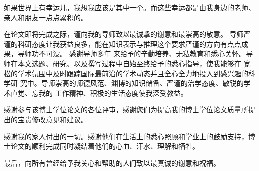 \begin{thanks}
如果世界上有幸运儿，我想我应该是其中一个。而这些幸运都是由我身边的老师、亲人和朋友一点点累积的。

在论文即将完成之际，谨向我的导师致以最诚挚的谢意和最崇高的敬意。
导师严谨的科研态度让我获益良多，能在知识表示与推理这个要求严谨的方向有点点成果，导师功不可没。
感谢导师多年
来给予的辛勤培养、无私教育和悉心关怀。导师在本文选题、研究、以及撰写过程中自始至终给予的悉心指导，使我能够在
宽松的学术氛围中及时跟踪国际最前沿的学术动态并且全心全力地投入到感兴趣的科学研
究中。导师崇高的师德风范、渊博的知识储备、严谨的治学态度、敏锐的学术直觉、忘我的
工作精神、积极的生活态度使我深受教益。


感谢参与该博士学位论文的各位评审，感谢您们为提高我的博士学位论文质量所提出的宝贵修改意见和建议。

感谢我的家人付出的一切。感谢他们在生活上的悉心照顾和学业上的鼓励支持，博
士论文的顺利完成同时凝结着他们的心血、汗水、理解和牺牲。

最后，向所有曾经给予我关心和帮助的人们致以最真诚的谢意和祝福。
%
%
%
%
%
%
%
%
%
%
	
	
\end{thanks}
